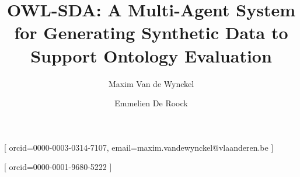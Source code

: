 \documentclass{ceurart}
\begin{document}
\title{OWL-SDA: A Multi-Agent System for Generating Synthetic Data to Support Ontology Evaluation}

\author[a,b]{Maxim {Van de Wynckel}}[%
orcid=0000-0003-0314-7107,
email=maxim.vandewynckel@vlaanderen.be
]
\cormark[1]
\author[c,d]{Emmelien {De Roock}}[%
orcid=0000-0001-9680-5222
]

\address[a]{Department of Environment and Spatial Development, Flemish Government, Belgium}
\address[b]{Web \& Information Systems Engineering Lab, Vrije Universiteit Brussel, Belgium}
\address[c]{UZ Brussel, Belgium}
\address[d]{Data Analytics Laboratory, Vrije Universiteit Brussel, Belgium}



\maketitle







\clearpage

\end{document}
